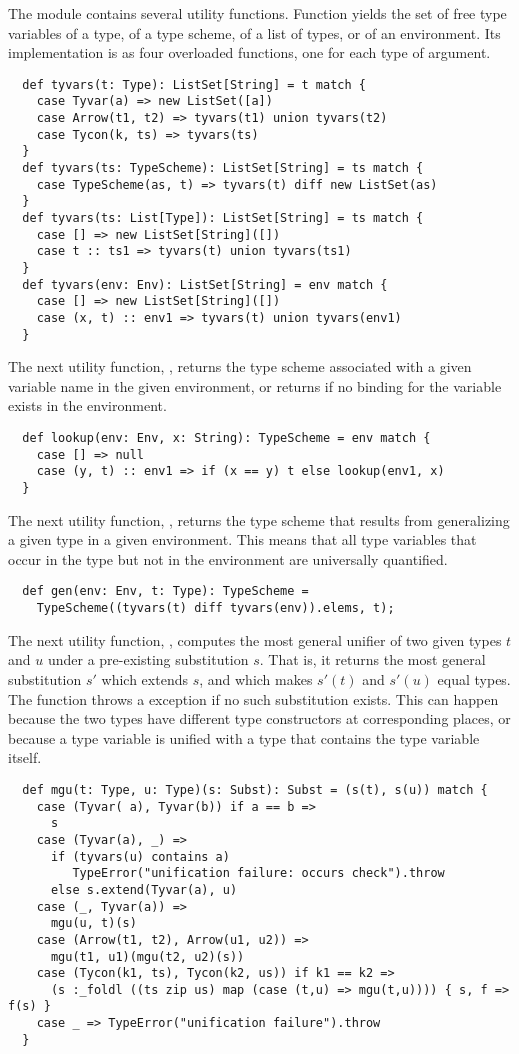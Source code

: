 \documentclass[11pt]{report}
\begin{document}
The \verb@TypeChecker@ module contains several utility
functions. Function
\verb@tyvars@ yields the set of free type variables of a type,
of a type scheme, of a list of types, or of an environment. Its
implementation is as four overloaded functions, one for each type of
argument.
\begin{verbatim}
  def tyvars(t: Type): ListSet[String] = t match {
    case Tyvar(a) => new ListSet([a])
    case Arrow(t1, t2) => tyvars(t1) union tyvars(t2)
    case Tycon(k, ts) => tyvars(ts)
  }
  def tyvars(ts: TypeScheme): ListSet[String] = ts match {
    case TypeScheme(as, t) => tyvars(t) diff new ListSet(as)
  }
  def tyvars(ts: List[Type]): ListSet[String] = ts match {
    case [] => new ListSet[String]([])
    case t :: ts1 => tyvars(t) union tyvars(ts1)
  }
  def tyvars(env: Env): ListSet[String] = env match {
    case [] => new ListSet[String]([])
    case (x, t) :: env1 => tyvars(t) union tyvars(env1)
  }
\end{verbatim}
The next utility function, \verb@lookup@, returns the type scheme
associated with a given variable name in the given environment, or
returns \verb@null@ if no binding for the variable exists in the environment.
\begin{verbatim}
  def lookup(env: Env, x: String): TypeScheme = env match {
    case [] => null
    case (y, t) :: env1 => if (x == y) t else lookup(env1, x)
  }
\end{verbatim}
The next utility function, \verb@gen@, returns the type scheme that
results from generalizing a given type in a given environment. This
means that all type variables that occur in the type but not in the
environment are universally quantified.
\begin{verbatim}
  def gen(env: Env, t: Type): TypeScheme =
    TypeScheme((tyvars(t) diff tyvars(env)).elems, t);
\end{verbatim}
The next utility function, \verb@mgu@, computes the most general
unifier of two given types $t$ and $u$ under a pre-existing
substitution $s$.  That is, it returns the most general
substitution $s'$ which extends $s$, and which makes $s'(t)$ and
$s'(u)$ equal types. The function throws a \verb@TypeError@ exception
if no such substitution exists. This can happen because the two types
have different type constructors at corresponding places, or because
a type variable is unified with a type that contains the type variable
itself.
\begin{verbatim}
  def mgu(t: Type, u: Type)(s: Subst): Subst = (s(t), s(u)) match {
    case (Tyvar( a), Tyvar(b)) if a == b =>
      s
    case (Tyvar(a), _) =>
      if (tyvars(u) contains a)
         TypeError("unification failure: occurs check").throw
      else s.extend(Tyvar(a), u)
    case (_, Tyvar(a)) =>
      mgu(u, t)(s)
    case (Arrow(t1, t2), Arrow(u1, u2)) =>
      mgu(t1, u1)(mgu(t2, u2)(s))
    case (Tycon(k1, ts), Tycon(k2, us)) if k1 == k2 =>
      (s :_foldl ((ts zip us) map (case (t,u) => mgu(t,u)))) { s, f => f(s) }
    case _ => TypeError("unification failure").throw
  }
\end{verbatim}
\end{document}

